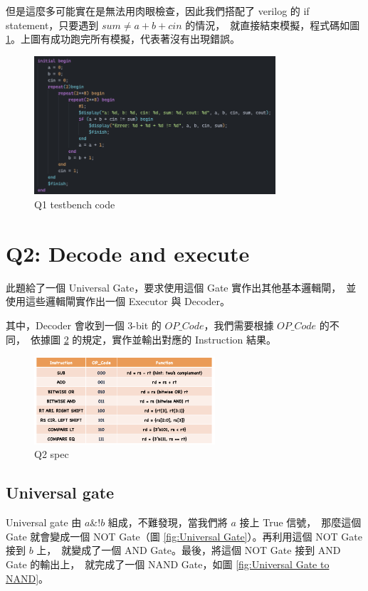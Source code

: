 \documentclass[10.5pt,compsoc,UTF8]{CjC}
\theoremstyle{mystyle}
\begin{document}
但是這麼多可能實在是無法用肉眼檢查，因此我們搭配了 verilog 的 if statement，只要遇到 $sum \neq a + b + cin$ 的情況，\
就直接結束模擬，程式碼如圖 \ref{fig:Q1_tb}。上圖有成功跑完所有模擬，代表著沒有出現錯誤。

\begin{figure}[h]
  \centering
  \includegraphics[width=0.8\textwidth]{Q1-tb.png}
  \caption{Q1 testbench code}
  \label{fig:Q1_tb}
\end{figure}

\newpage

\section{Q2: Decode and execute}
\label{sec:Q2}
此題給了一個 Universal Gate，要求使用這個 Gate 實作出其他基本邏輯閘，\
並使用這些邏輯閘實作出一個 Executor 與 Decoder。
\par
其中，Decoder 會收到一個 3-bit 的 $OP\_Code$，我們需要根據 $OP\_Code$ 的不同，\
依據圖 \ref{fig:Q2-spec} 的規定，實作並輸出對應的 Instruction 結果。

\begin{figure}[h]
  \centering
  \includegraphics[width=0.6\textwidth]{Q2-spec.png}
  \caption{Q2 spec}
  \label{fig:Q2-spec}
\end{figure}


\subsection{Universal gate}
Universal gate 由 $a \& !b$ 組成，不難發現，當我們將 $a$ 接上 True 信號，\
那麼這個 Gate 就會變成一個 NOT Gate（圖 \ref{fig:Universal Gate}）。再利用這個 NOT Gate 接到 $b$ 上，\
就變成了一個 AND Gate。最後，將這個 NOT Gate 接到 AND Gate 的輸出上，\
就完成了一個 NAND Gate，如圖 \ref{fig:Universal Gate to NAND}。
\end{document}
